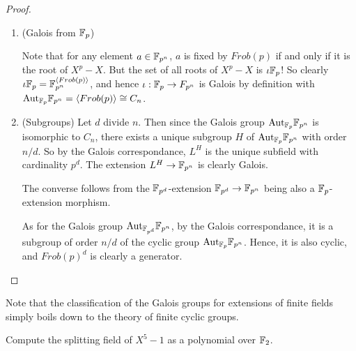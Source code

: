 \documentclass[../book.tex]{subfiles}
\begin{document}
\begin{proof}
\begin{enumerate}
    \item (Galois from $\mathbb{F}_p$)
        
        Note that for any element $a \in \mathbb{F}_{p^n}$,
        $a$ is fixed by $Frob(p)$ if and only if it is the root of $X^p - X$. 
        But the set of all roots of $X^p - X$ is $\iota \mathbb{F}_p$!
        So clearly $\iota \mathbb{F}_p = \mathbb{F}_{p^n}^{\langle Frob(p)\rangle}$,
        and hence $\iota : \mathbb{F}_p \to F_{p^n}$ is Galois by definition 
        with $\mathrm{Aut}_{\mathbb{F}_p}\mathbb{F}_{p^n} = \langle Frob(p)\rangle \cong C_n$.
        
    \item (Subgroups)
        Let $d$ divide $n$.
        Then since the Galois group $\mathrm{Aut}_{\mathbb{F}_p}\mathbb{F}_{p^n}$ is isomorphic to $C_n$,
        there exists a unique subgroup $H$ 
        of $\mathrm{Aut}_{\mathbb{F}_p}\mathbb{F}_{p^n}$ with order $n/d$. 
        So by the Galois correspondance, 
        $L^H$ is the unique subfield with cardinality $p^d$.
        The extension $L^H \to \mathbb{F}_{p^n}$ is clearly Galois.
        
        The converse follows from the $\mathbb{F}_{p^d}$-extension $\mathbb{F}_{p^d} \to \mathbb{F}_{p^n}$
        being also a $\mathbb{F}_p$-extension morphism.
        
        As for the Galois group $\mathrm{Aut}_{\mathbb{F}_{p^d}}\mathbb{F}_{p^n}$,
        by the Galois correspondance, 
        it is a subgroup of order $n/d$ 
        of the cyclic group $\mathrm{Aut}_{\mathbb{F}_{p}}\mathbb{F}_{p^n}$.
        Hence, it is also cyclic, and $Frob(p)^{d}$ is clearly a generator.
    \end{enumerate}        
\end{proof}
\begin{rmk}
    
    Note that the classification of the Galois groups for extensions of finite fields
    simply boils down to the theory of finite cyclic groups. 
    
\end{rmk}

\begin{ex}
    
    Compute the splitting field of $X^5 - 1$ as a polynomial over $\mathbb{F}_2$. 
    
\end{ex}
%
\end{document}
